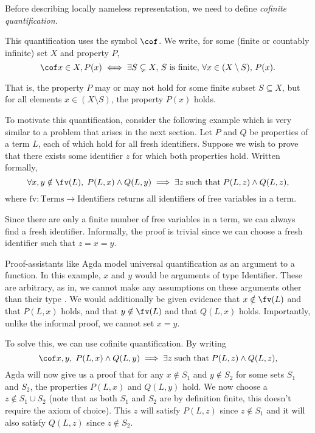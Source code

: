 Before describing locally nameless representation, we need to define \textit{cofinite
quantification}.

This quantification uses the symbol $\cof$. We write, for some (finite or countably infinite) set $X$ and property $P$,
\begin{equation}
  \label{equation:cofinite}
  \cof x \in X, P(x) \iff
  \exists S \subsetneq X, \, S \text{ is finite}, \, \forall x \in (X \setminus S), \, P(x).
\end{equation}

That is, the property $P$ may or may not hold for some finite subset $S \subseteq X$, but for all
elements $x \in (X \setminus S)$, the property $P(x)$ holds.

To motivate this quantification, consider the following example which is very similar to a problem
that arises in the next section. Let $P$ and $Q$ be properties of a term $L$, each of which hold for
all fresh identifiers. Suppose we wish to prove that there exists some identifier $z$ for which both
properties hold. Written formally,
\begin{equation*}
  \forall x, y \notin \fv(L), \; P(L, x) \wedge Q(L, y)
  \implies \exists z \; \text{such that} \; P(L, z) \wedge Q(L, z),
\end{equation*}
where $\text{fv} \colon \text{Terms} \to \text{Identifiers}$ returns all identifiers of free
variables in a term.

Since there are only a finite number of free variables in a term, we can always find a fresh
identifier. Informally, the proof is trivial since we can choose a fresh identifier such that $z = x
= y$.

Proof-assistants like Agda model universal quantification as an argument to a function. In this
example, $x$ and $y$ would be arguments of type Identifier. These are arbitrary, as in, we cannot
make any assumptions on these arguments other than their type
\citep[chapter~Quantifier]{wadler_programming_2022}. We would additionally be given evidence that $x
\notin \fv(L)$ and that $P(L, x)$ holds, and that $y \notin \fv(L)$ and that $Q(L, x)$ holds.
Importantly, unlike the informal proof, we cannot set $x = y$.

To solve this, we can use cofinite quantification. By writing
\begin{equation*}
  \cof x, y, \; P(L, x) \wedge Q(L, y)
  \implies \exists z \; \text{such that} \; P(L, z) \wedge Q(L, z),
\end{equation*}
Agda will now give us a proof that for any $x \notin S_1$ and $y \notin S_2$ for some sets $S_1$ and
$S_2$, the properties $P(L, x)$ and $Q(L, y)$ hold. We now choose a $z \notin S_1 \cup
S_2$ (note that as both $S_1$ and $S_2$ are by definition finite, this doesn't require the
axiom of choice). This $z$ will satisfy $P(L, z)$ since $z \notin S_1$ and it will also satisfy
$Q(L, z)$ since $z \notin S_2$.

